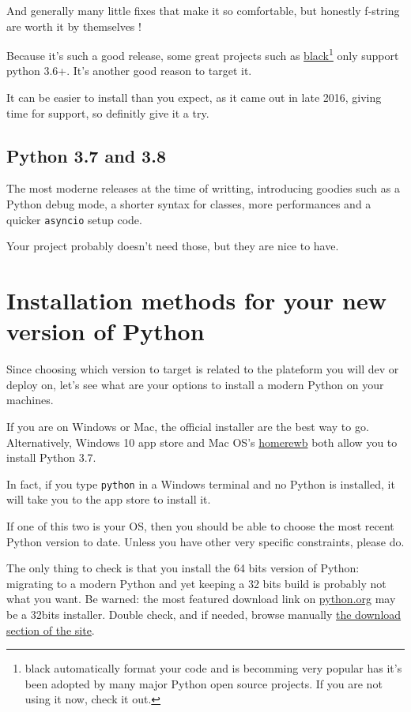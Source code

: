 And generally many little fixes that make it so comfortable, but honestly f-string are worth it by themselves !

Because it's such a good release, some great projects such as \href{https://github.com/psf/black}{black}\footnote{black automatically format your code and is becomming very popular has it's been adopted by many major Python open source projects. If you are not using it now, check it out.} only support python 3.6+. It's another good reason to target it.

It can be easier to install than you expect, as it came out in late 2016, giving time for support, so definitly give it a try.

\subsection{Python 3.7 and 3.8}

The most moderne releases at the time of writting, introducing goodies such as a Python debug mode, a shorter syntax for classes, more performances and a quicker \lstinline{asyncio} setup code.

Your project probably doesn't need those, but they are nice to have.

\section{Installation methods for your new version of Python}

Since choosing which version to target is related to the plateform you will dev or deploy on, let's see what are your options to install a modern Python on your machines.

If you are on Windows or Mac, the official installer are the best way to go. Alternatively, Windows 10 app store and Mac OS's \href{https://brew.sh/index_fr}{homerewb} both allow you to install Python 3.7.

In fact, if you type \lstinline{python} in a Windows terminal and no Python is installed, it will take you to the app store to install it.

If one of this two is your OS, then you should be able to choose the most recent Python version to date. Unless you have other very specific constraints, please do.

The only thing to check is that you install the 64 bits version of Python: migrating to a modern Python and yet keeping a 32 bits build is probably not what you want. Be warned: the most featured download link on \href{https://python.org}{python.org} may be a 32bits installer. Double check, and if needed, browse manually \href{https://www.python.org/downloads/}{the download section of the site}.

